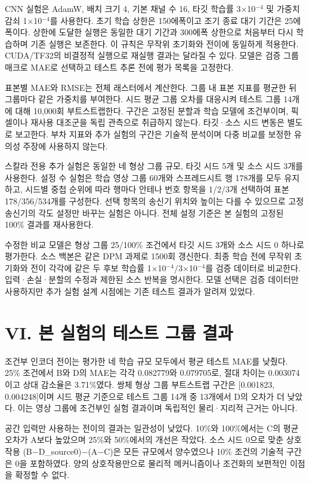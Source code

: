 \documentclass[10pt,a4paper]{article}
\begin{document}
CNN 실험은 AdamW, 배치 크기 4, 기본 채널 수 16, 타깃 학습률 3×10$^{-4}$ 및 가중치 감쇠 1×10$^{-4}$를 사용한다. 초기 학습 상한은 150에폭이고 조기 종료 대기 기간은 25에폭이다. 상한에 도달한 실행은 동일한 대기 기간과 300에폭 상한으로 처음부터 다시 학습하며 기존 실행은 보존한다. 이 규칙은 무작위 초기화와 전이에 동일하게 적용한다. CUDA/TF32의 비결정적 실행으로 재실행 결과는 달라질 수 있다. 모델은 검증 그룹 매크로 MAE로 선택하고 테스트 추론 전에 평가 목록을 고정한다.

표본별 MAE와 RMSE는 전체 래스터에서 계산한다. 그룹 내 표본 지표를 평균한 뒤 그룹마다 같은 가중치를 부여한다. 시드 평균 그룹 오차를 대응시켜 테스트 그룹 14개에 대해 10,000회 부트스트랩한다. 구간은 고정된 분할과 학습 모델에 조건부이며, 픽셀이나 재사용 대조군을 독립 관측으로 취급하지 않는다. 타깃·소스 시드 변동은 별도로 보고한다. 부차 지표와 추가 실험의 구간은 기술적 분석이며 다중 비교를 보정한 유의성 주장에 사용하지 않는다.

스칼라 전용 추가 실험은 동일한 네 형상 그룹 규모, 타깃 시드 5개 및 소스 시드 3개를 사용한다. 설정 수 실험은 학습 영상 그룹 60개와 스프레드시트 행 178개를 모두 유지하고, 시드별 중첩 순위에 따라 행마다 안테나 번호 항목을 1/2/3개 선택하여 표본 178/356/534개를 구성한다. 선택 항목의 송신기 위치와 높이는 다를 수 있으므로 고정 송신기의 각도 설정만 바꾸는 실험은 아니다. 전체 설정 기준은 본 실험의 고정된 100\% 결과를 재사용한다.

수정한 비교 모델은 형상 그룹 25/100\% 조건에서 타깃 시드 3개와 소스 시드 0 하나로 평가한다. 소스 백본은 같은 DPM 과제로 1500회 갱신한다. 최종 학습 전에 무작위 초기화와 전이 각각에 같은 두 후보 학습률 1×10$^{-4}$/3×10$^{-4}$를 검증 데이터로 비교한다. 입력·손실·분할의 수정과 제한된 소스 반복을 명시한다. 모델 선택은 검증 데이터만 사용하지만 추가 실험 설계 시점에는 기존 테스트 결과가 알려져 있었다.

\section*{VI. 본 실험의 테스트 그룹 결과}
조건부 인코더 전이는 평가한 네 학습 규모 모두에서 평균 테스트 MAE를 낮췄다. 25\% 조건에서 B와 D의 MAE는 각각 0.082779와 0.079705로, 절대 차이는 0.003074이고 상대 감소율은 3.71\%였다. 쌍체 형상 그룹 부트스트랩 구간은 [0.001823, 0.004248]이며 시드 평균 기준으로 테스트 그룹 14개 중 13개에서 D의 오차가 더 낮았다. 이는 영상 그룹에 조건부인 실험 결과이며 독립적인 물리·지리적 근거는 아니다.

공간 입력만 사용하는 전이의 결과는 일관성이 낮았다. 10\%와 100\%에서는 C의 평균 오차가 A보다 높았으며 25\%와 50\%에서의 개선은 작았다. 소스 시드 0으로 맞춘 상호작용 (B−D\_source0)−(A−C)은 모든 규모에서 양수였으나 10\% 조건의 기술적 구간은 0을 포함하였다. 양의 상호작용만으로 물리적 메커니즘이나 조건화의 보편적인 이점을 확정할 수 없다.
\end{document}

